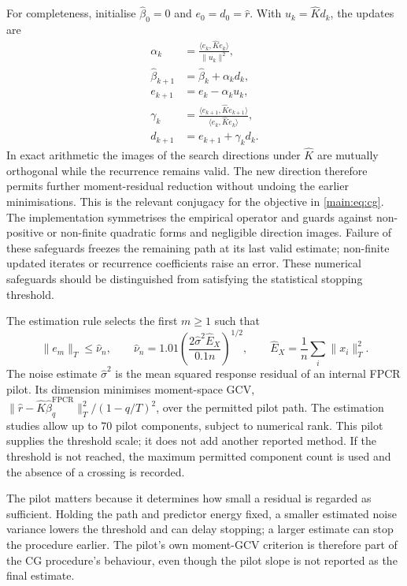 For completeness, initialise $\widehat\beta_0=0$ and
$e_0=d_0=\widehat r$. With $u_k=\widehat Kd_k$, the updates are
\begin{align}
 \alpha_k&=\frac{\langle e_k,\widehat K e_k\rangle}{\|u_k\|^2},
 \label{main:eq:cr-alpha}\\
 \widehat\beta_{k+1}&=\widehat\beta_k+\alpha_kd_k,
 \label{main:eq:cr-slope}\\
 e_{k+1}&=e_k-\alpha_ku_k,
 \label{main:eq:cr-residual}\\
 \gamma_k&=\frac{\langle e_{k+1},\widehat K e_{k+1}\rangle}
                    {\langle e_k,\widehat K e_k\rangle},
 \label{main:eq:cr-gamma}\\
 d_{k+1}&=e_{k+1}+\gamma_kd_k.
 \label{main:eq:cr-direction}
\end{align}
In exact arithmetic the images of the search directions under
$\widehat K$ are mutually orthogonal while the recurrence remains valid.
The new direction therefore permits further moment-residual reduction
without undoing the earlier minimisations. This is the relevant
conjugacy for the objective in \eqref{main:eq:cg}. The implementation
symmetrises the empirical operator and guards against non-positive or
non-finite quadratic forms and negligible direction images. Failure of
these safeguards freezes the remaining path at its last valid estimate;
non-finite updated iterates or recurrence coefficients raise an error.
These numerical safeguards should be distinguished from satisfying the
statistical stopping threshold.

The estimation rule selects the first $m\geq1$ such that
\begin{equation}
 \|e_m\|_T\leq\widehat\nu_n,
 \qquad
 \widehat\nu_n=1.01\left(
       \frac{2\widehat\sigma^2\widehat E_X}{0.1n}
                    \right)^{1/2},
 \qquad \widehat E_X=\frac1n\sum_i\|x_i\|_T^2.
 \label{main:eq:cg-threshold}
\end{equation}
The noise estimate $\widehat\sigma^2$ is the mean squared response
residual of an internal FPCR pilot. Its dimension minimises moment-space
GCV, $\|\widehat r-\widehat K\widehat\beta_q^{\mathrm{FPCR}}\|_T^2/
(1-q/T)^2$, over the permitted pilot path. The estimation studies allow
up to 70 pilot components, subject to numerical rank. This pilot supplies
the threshold scale; it does not add another reported method. If the
threshold is not reached, the maximum permitted component count is used
and the absence of a crossing is recorded.

The pilot matters because it determines how small a residual is regarded
as sufficient. Holding the path and predictor energy fixed, a smaller
estimated noise variance lowers the threshold and can delay stopping;
a larger estimate can stop the procedure earlier. The pilot's own
moment-GCV criterion is therefore part of the CG procedure's behaviour,
even though the pilot slope is not reported as the final estimate.

